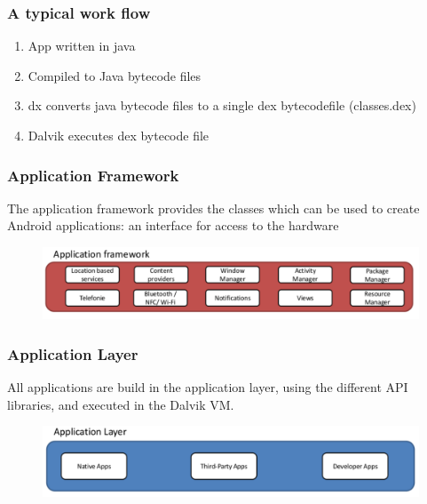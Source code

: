 \documentclass{beamer}
\begin{document}
\begin{frame}
\frametitle{A typical work flow}

\begin{enumerate}
	\item App written in java
	\item Compiled to Java bytecode files
	\item dx converts java bytecode files to a single dex bytecodefile (classes.dex)
	\item Dalvik executes dex bytecode file 
\end{enumerate}
\end{frame}

\begin{frame}
\frametitle{Application Framework}
	The application framework provides the classes which can be used to create Android applications: an interface for access to the hardware 
	\begin{figure}[b]
	\centering
		\includegraphics[width=\textwidth]{img/appFramework.pdf}
	\label{fig:kernel}
\end{figure}
\end{frame}

\begin{frame}
\frametitle{Application Layer}
	All applications are build in the application layer, using the different API libraries, and executed in the Dalvik VM. 
	\begin{figure}[b]
	\centering
		\includegraphics[width=\textwidth]{img/apllicationLayer.pdf}
	\label{fig:kernel}
\end{figure}
\end{frame}
\end{document}
